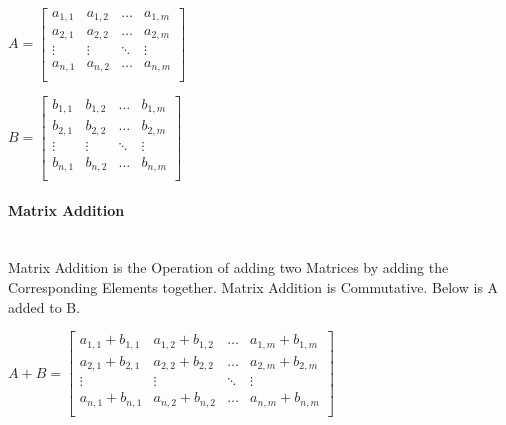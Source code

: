 \begin{flushleft}
                \begin{center}
                    $
                    A = 
                    \begin{bmatrix}
                        a_{1,1} & a_{1,2} & \hdots  & a_{1,m} \\
                        a_{2,1} & a_{2,2} & \hdots  & a_{2,m} \\
                        \vdots  & \vdots  & \ddots  & \vdots  \\
                        a_{n,1} & a_{n,2} & \hdots  & a_{n,m} \\
                    \end{bmatrix}
                    $
                \end{center}
                \vspace{0.2cm}
                \begin{center}
                    $
                    B = 
                    \begin{bmatrix}
                        b_{1,1} & b_{1,2} & \hdots  & b_{1,m} \\
                        b_{2,1} & b_{2,2} & \hdots  & b_{2,m} \\
                        \vdots  & \vdots  & \ddots  & \vdots  \\
                        b_{n,1} & b_{n,2} & \hdots  & b_{n,m} \\
                    \end{bmatrix}
                    $
                \end{center}

                \paragraph{Matrix Addition} \mbox{} \\
                    \vspace{0.2cm}
                    Matrix Addition is the Operation of adding two Matrices by adding the Corresponding Elements together. Matrix Addition is Commutative. 
                    Below is A added to B. \\

                    \begin{center}
                        $
                        A + B =
                        \begin{bmatrix}
                            a_{1,1} + b_{1,1} & a_{1,2} + b_{1,2} & \hdots  & a_{1,m} + b_{1,m} \\
                            a_{2,1} + b_{2,1} & a_{2,2} + b_{2,2} & \hdots  & a_{2,m} + b_{2,m} \\
                            \vdots            & \vdots            & \ddots  & \vdots            \\
                            a_{n,1} + b_{n,1} & a_{n,2} + b_{n,2} & \hdots  & a_{n,m} + b_{n,m} \\
                        \end{bmatrix}
                        $
                    \end{center}


\end{flushleft}
